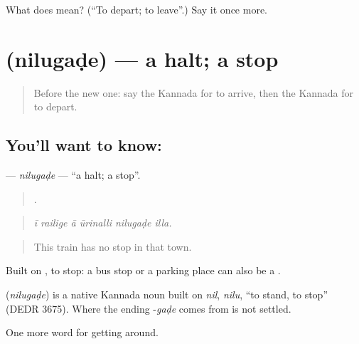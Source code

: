 \begin{tcolorbox}[breakable,colback=teal!4,colframe=teal!35!black,title={Before you move on}]
What does  mean? (\textquotedblleft{}To depart; to leave\textquotedblright{}.) Say it once more.
\end{tcolorbox}
\section[\texorpdfstring{\kn{ನಿಲುಗಡೆ} (nilugaḍe)}{ನಿಲುಗಡೆ (nilugaḍe)}]{ (nilugaḍe) — a halt; a stop}

\label{lesson:KA-C434-nilugade}



\begin{quote}
Before the new one: say the Kannada for to arrive, then the Kannada for to depart.
\end{quote}

\subsection*{You'll want to know: }
\textbf{} — \emph{nilugaḍe} — \textquotedblleft{}a halt; a stop\textquotedblright{}.

\begin{quote}
     .
\end{quote}

\begin{quote}
\emph{ī railige ā ūrinalli nilugaḍe illa.}
\end{quote}

\begin{quote}
This train has no stop in that town.
\end{quote}

Built on , to stop: a bus stop or a parking place can also be a .

\begin{cousinweb}
\textbf{} (\emph{nilugaḍe}) is a native Kannada noun built on \emph{nil}, \emph{nilu}, \textquotedblleft{}to stand, to stop\textquotedblright{} (DEDR 3675). Where the ending -\emph{gaḍe} comes from is not settled.
\end{cousinweb}

\begin{grammarlens}[title={What you've built}]
One more word for getting around.
\end{grammarlens}

